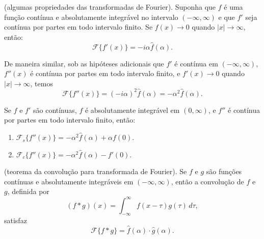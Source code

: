 \documentclass{article}
\begin{document}
\begin{prop} (algumas propriedades das transformadas de Fourier).
    Suponha que \(f\) é uma função contínua e absolutamente integrável no intervalo \((-\infty, \infty)\) e que \(f'\) seja contínua por partes em todo intervalo finito. Se \(f(x) \to 0\) quando \(|x| \to \infty\), então:
    \begin{equation}
        \mathcal{F}\{f'(x)\} = -i\alpha \widehat{f}(\alpha).
    \end{equation}

    De maneira similar, sob as hipóteses adicionais que \(f'\) é contínua em \((-\infty, \infty)\), \(f''(x)\) é contínua por partes em todo intervalo finito, e \(f'(x) \to 0\) quando \(|x| \to \infty\), temos 
    \begin{equation}
        \mathcal{F}\{f''(x)\} = (-i\alpha)^2 \widehat{f}(\alpha) = -\alpha^2 \widehat{f}(\alpha).
    \end{equation}

    Se \(f\) e \(f'\) são contínuas, \(f\) é absolutamente integrável em \((0, \infty)\), e \(f''\) é contínua por partes em todo intervalo finito, então:
    \begin{enumerate}
        \item [\textup{(a)}] \(\mathcal{F}_s\{f''(x)\} = -\alpha^2 \widehat{f}(\alpha) + \alpha f(0)\).
        \item [\textup{(b)}] \(\mathcal{F}_c\{f''(x)\} = -\alpha^2 \widehat{f}(\alpha) - f'(0)\).
    \end{enumerate}
\end{prop}

\begin{thm} (teorema da convolução para transformada de Fourier).
    Se \(f\) e \(g\) são funções contínuas e absolutamente integráveis em \((-\infty, \infty)\), então a convolução de \(f\) e \(g\), definida por
    \begin{equation}
        (f * g)(x) = \int_{-\infty}^{\infty} f(x - \tau) g(\tau) \, d\tau,
    \end{equation}
    \noindent satisfaz
    \begin{equation}
        \mathcal{F}\{f * g\} = \widehat{f}(\alpha) \cdot \widehat{g}(\alpha).
    \end{equation}
\end{thm}
\end{document}
